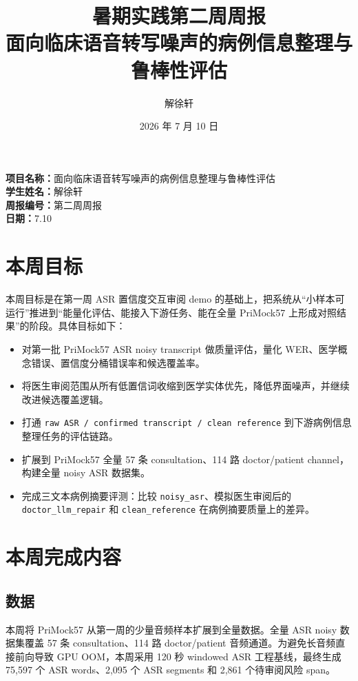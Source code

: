 \documentclass[UTF8,a4paper,12pt]{ctexart}
\title{\textbf{暑期实践第二周周报}\\
\large 面向临床语音转写噪声的病例信息整理与鲁棒性评估}
\author{解徐轩}
\date{2026 年 7 月 10 日}
\newcommand{\code}[1]{\texttt{#1}}
\begin{document}
\maketitle

\noindent\textbf{项目名称：}面向临床语音转写噪声的病例信息整理与鲁棒性评估\\
\textbf{学生姓名：}解徐轩\\
\textbf{周报编号：}第二周周报\\
\textbf{日期：}7.10

\section{本周目标}

本周目标是在第一周 ASR 置信度交互审阅 demo 的基础上，把系统从“小样本可运行”推进到“能量化评估、能接入下游任务、能在全量 PriMock57 上形成对照结果”的阶段。具体目标如下：

\begin{itemize}
  \item 对第一批 PriMock57 ASR noisy transcript 做质量评估，量化 WER、医学概念错误、置信度分桶错误率和候选覆盖率。
  \item 将医生审阅范围从所有低置信词收缩到医学实体优先，降低界面噪声，并继续改进候选覆盖逻辑。
  \item 打通 \code{raw ASR / confirmed transcript / clean reference} 到下游病例信息整理任务的评估链路。
  \item 扩展到 PriMock57 全量 57 条 consultation、114 路 doctor/patient channel，构建全量 noisy ASR 数据集。
  \item 完成三文本病例摘要评测：比较 \code{noisy\_asr}、模拟医生审阅后的 \code{doctor\_llm\_repair} 和 \code{clean\_reference} 在病例摘要质量上的差异。
\end{itemize}

\section{本周完成内容}

\subsection*{数据}

本周将 PriMock57 从第一周的少量音频样本扩展到全量数据。全量 ASR noisy 数据集覆盖 57 条 consultation、114 路 doctor/patient 音频通道。为避免长音频直接前向导致 GPU OOM，本周采用 120 秒 windowed ASR 工程基线，最终生成 75,597 个 ASR words、2,095 个 ASR segments 和 2,861 个待审阅风险 span。
\end{document}
